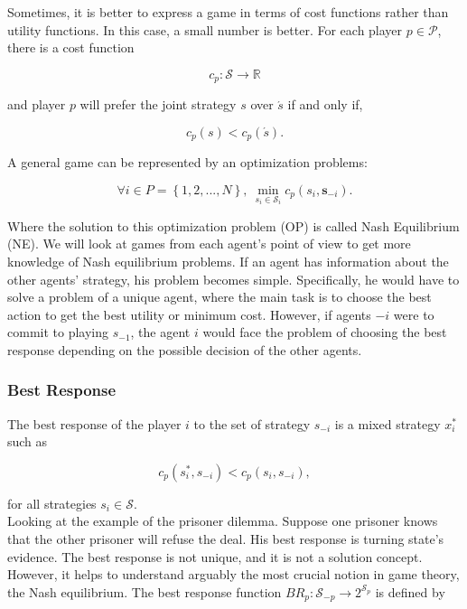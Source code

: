 Sometimes, it is better to express a game in terms of cost functions rather than utility functions. In this case, a small number is better. For each player $p \in \mathcal{P}$, there is a cost function 

\begin{equation*}
c_p : \mathcal{S} \to \mathbb{R}
\end{equation*}

and player $p$ will prefer the joint strategy $s$ over $\acute{s}$ if and only if, 

\begin{equation*}
c_p(s) < c_p(\acute{s}).
\end{equation*}

A general game can be represented by an optimization problems: 

\begin{equation*}
    \forall i \in P = \left\{ 1,2,..., N \right\}, \ \min_{s_i \in \mathcal{S}_i} c_p(s_i, \textbf{s}_{-i}).
\end{equation*}

Where the solution to this optimization problem (OP) is called Nash Equilibrium (NE). We will look at games from each agent's point of view to get more knowledge of Nash equilibrium problems. If an agent has information about the other agents' strategy, his problem becomes simple. Specifically, he would have to solve a problem of a unique agent, where the main task is to choose the best action to get the best utility or minimum cost. However, if agents $-i$ were to commit to playing $s_{-1}$, the agent $i$ would face the problem of choosing the best response depending on the possible decision of the other agents.

\subsubsection{Best Response}

The best response of the player $i$ to the set of strategy $s_{-i}$ is a mixed strategy $x_i^{*}$ such as 

\begin{equation*}
c_p(s_i^*, s_{-i}) < c_p(s_i, s_{-i}),
\end{equation*}
 
for all strategies $ s_i \in \mathcal{S}$. \\

Looking at the example of the prisoner dilemma. Suppose one prisoner knows that the other prisoner will refuse the deal. His best response is turning state's evidence. The best response is not unique, and it is not a solution concept. However, it helps to understand arguably the most crucial notion in game theory, the Nash equilibrium.
The best response function $BR_p : \mathcal{S}_{-p} \to 2^{\mathcal{S}_p}$ is defined by 


